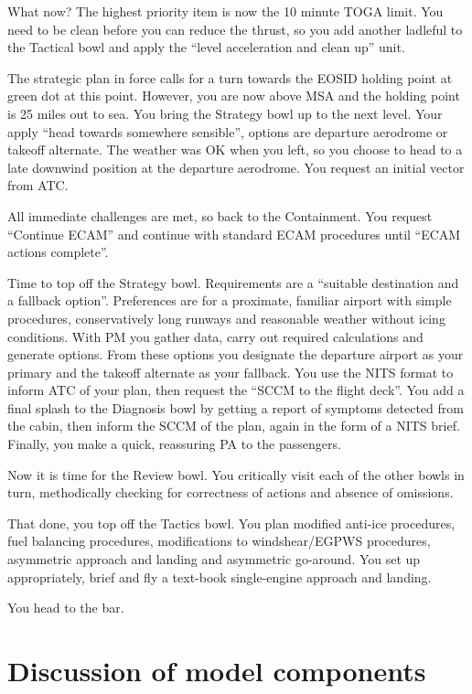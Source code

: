 \documentclass[a5paper,11pt,titlepage]{article}
\begin{document}
What now? The highest priority item is now the 10 minute TOGA limit. You
need to be clean before you can reduce the thrust, so you add another
ladleful to the Tactical bowl and apply the ``level acceleration and clean
up'' unit.

The strategic plan in force calls for a turn towards the EOSID holding
point at green dot at this point. However, you are now above MSA and the
holding point is 25 miles out to sea. You bring the Strategy bowl up to
the next level. Your apply ``head towards somewhere sensible'', options
are departure aerodrome or takeoff alternate. The weather was OK when
you left, so you choose to head to a late downwind position at the
departure aerodrome. You request an initial vector from ATC.

All immediate challenges are met, so back to the Containment. You
request ``Continue ECAM'' and continue with standard ECAM procedures
until ``ECAM actions complete''.

Time to top off the Strategy bowl. Requirements are a ``suitable
destination and a fallback option''. Preferences are for a proximate,
familiar airport with simple procedures, conservatively long runways and
reasonable weather without icing conditions. With PM you gather data,
carry out required calculations and generate options. From these options
you designate the departure airport as your primary and the takeoff
alternate as your fallback. You use the NITS format to inform ATC of
your plan, then request the ``SCCM to the flight deck''. You add a final
splash to the Diagnosis bowl by getting a report of symptoms detected
from the cabin, then inform the SCCM of the plan, again in the form of a
NITS brief. Finally, you make a quick, reassuring PA to the passengers.

Now it is time for the Review bowl. You critically visit each of the
other bowls in turn, methodically checking for correctness of actions
and absence of omissions.

That done, you top off the Tactics bowl. You plan modified anti-ice
procedures, fuel balancing procedures, modifications to windshear/EGPWS
procedures, asymmetric approach and landing and asymmetric
go-around. You set up appropriately, brief and fly a text-book
single-engine approach and landing.

You head to the bar.

\section{Discussion of model components}
\end{document}
